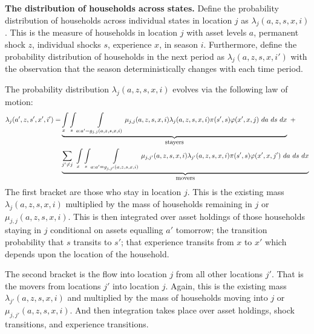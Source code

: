 \documentclass[12pt,pdftex]{article}
\begin{document}
\textbf{The distribution of households across states.} Define the probability distribution of households across individual states in location $j$ as $\lambda_{j}(a, z, s, x, i)$. This is the measure of households in location $j$ with asset levels $a$, permanent shock $z$, individual shocks $s$, experience $x$, in season $i$. Furthermore, define the probability distribution of households in the next period as $\lambda_{j}(a, z, s, x, i')$ with the observation that the season deterministically changes with each time period.

The probability distribution $\lambda_{j}(a, z, s, x, i)$ evolves via the following law of motion:
\begin{align}
\lambda_{j}(a', z, s', x', i')  =  & \underbrace{ \int\limits_{x} \int\limits_{s} \int\limits_{a: a' = g_{j,j}(a, z, s, x, i)} \mu_{j,j}(a, z, s, x, i) \lambda_{j}(a, z, s, x, i) \pi(s',s) \varphi(x',x, j)\ da \ ds \ dx }_{\small \mbox{stayers}} \ + \nonumber \\
& \underbrace{\sum_{j' \neq j}\  \int\limits_{x} \int\limits_{s} \int\limits_{a: a' = g_{j,j'}(a, z, s, x, i)}  \mu_{j,j'}(a, z, s, x, i) \lambda_{j'}(a, z, s, x, i) \pi(s',s) \varphi(x',x, j') \ da \ ds \ dx }_{\small \mbox{movers}}
\label{appendix-eq:dce_law_motion}
\end{align}
The first bracket are those who stay in location $j$. This is the existing mass $\lambda_{j}(a, z, s, x, i)$ multiplied by the mass of households remaining in $j$ or $\mu_{j,j}(a, z, s, x, i)$. This is then integrated over asset holdings of those households staying in $j$ conditional on assets equalling $a'$ tomorrow; the transition probability that $s$ transits to $s'$; that experience transits from $x$ to $x'$ which depends upon the location of the household.

The second bracket is the flow into location $j$ from all other locations $j'$. That is the movers from locations $j'$ into location $j$. Again, this is the existing mass $\lambda_{j'}(a, z, s, x, i)$ and multiplied by the mass of households moving into $j$ or $\mu_{j,j'}(a, z, s, x, i)$. And then integration takes place over asset holdings, shock transitions, and experience transitions.
\end{document}
